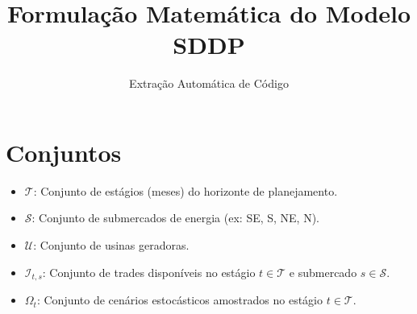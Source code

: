 \documentclass{article}
\begin{document}
\title{Formulação Matemática do Modelo SDDP}
\author{Extração Automática de Código}
\date{}
\maketitle

\section{Conjuntos}
\begin{itemize}
    \item $\mathcal{T}$: Conjunto de estágios (meses) do horizonte de planejamento.
    
    \item $\mathcal{S}$: Conjunto de submercados de energia (ex: SE, S, NE, N).
    
    \item $\mathcal{U}$: Conjunto de usinas geradoras.
    
    \item $\mathcal{I}_{t,s}$: Conjunto de trades disponíveis no estágio $t \in \mathcal{T}$ e submercado $s \in \mathcal{S}$.
    
    \item $\Omega_t$: Conjunto de cenários estocásticos amostrados no estágio $t \in \mathcal{T}$.
\end{itemize}
\end{document}

